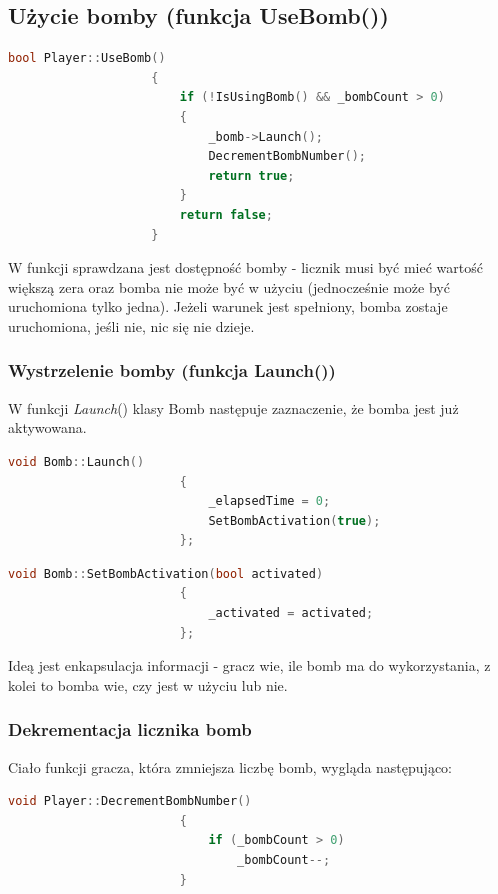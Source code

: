 \documentclass[a4paper,twoside]{article}
\begin{document}
			\subsection{Użycie bomby (funkcja UseBomb())}
				\begin{lstlisting}[language=C++]
					bool Player::UseBomb()
					{
						if (!IsUsingBomb() && _bombCount > 0)	
						{
							_bomb->Launch();
							DecrementBombNumber();
							return true;
						}
						return false;
					}
				\end{lstlisting}
				W funkcji sprawdzana jest dostępność bomby - licznik musi być mieć wartość większą zera oraz bomba nie może być w użyciu (jednocześnie może być uruchomiona tylko jedna). Jeżeli warunek jest spełniony, bomba zostaje uruchomiona, jeśli nie, nic się nie dzieje.
				\subsubsection{Wystrzelenie bomby (funkcja Launch())}
					W funkcji \textit{Launch}() klasy Bomb następuje zaznaczenie, że bomba jest już aktywowana.
					\begin{lstlisting}[language=C++]
						void Bomb::Launch()
						{
							_elapsedTime = 0;
							SetBombActivation(true);
						};
					\end{lstlisting}
					\begin{lstlisting}[language=C++]
						void Bomb::SetBombActivation(bool activated)
						{
							_activated = activated;
						};
					\end{lstlisting}
					Ideą jest enkapsulacja informacji - gracz wie, ile bomb ma do wykorzystania, z kolei to bomba wie, czy jest w użyciu lub nie.
				\subsubsection{Dekrementacja licznika bomb}
					Ciało funkcji gracza, która zmniejsza liczbę bomb, wygląda następująco:
					\begin{lstlisting}[language=C++]
						void Player::DecrementBombNumber()
						{
							if (_bombCount > 0)
								_bombCount--;
						}
					\end{lstlisting}
\end{document}
